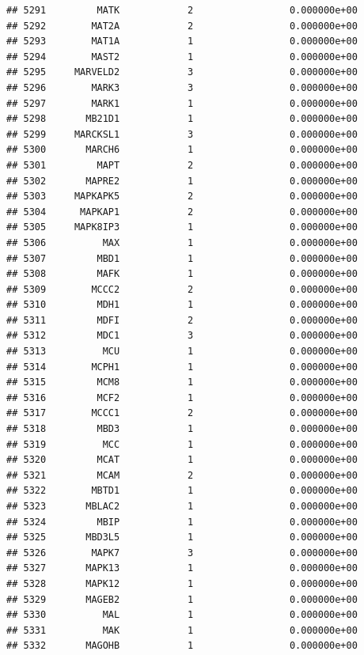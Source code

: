 \documentclass[
]{article}
\begin{document}
\begin{verbatim}
## 5291         MATK            2                 0.000000e+00
## 5292        MAT2A            2                 0.000000e+00
## 5293        MAT1A            1                 0.000000e+00
## 5294        MAST2            1                 0.000000e+00
## 5295     MARVELD2            3                 0.000000e+00
## 5296        MARK3            3                 0.000000e+00
## 5297        MARK1            1                 0.000000e+00
## 5298       MB21D1            1                 0.000000e+00
## 5299     MARCKSL1            3                 0.000000e+00
## 5300       MARCH6            1                 0.000000e+00
## 5301         MAPT            2                 0.000000e+00
## 5302       MAPRE2            1                 0.000000e+00
## 5303     MAPKAPK5            2                 0.000000e+00
## 5304      MAPKAP1            2                 0.000000e+00
## 5305     MAPK8IP3            1                 0.000000e+00
## 5306          MAX            1                 0.000000e+00
## 5307         MBD1            1                 0.000000e+00
## 5308         MAFK            1                 0.000000e+00
## 5309        MCCC2            2                 0.000000e+00
## 5310         MDH1            1                 0.000000e+00
## 5311         MDFI            2                 0.000000e+00
## 5312         MDC1            3                 0.000000e+00
## 5313          MCU            1                 0.000000e+00
## 5314        MCPH1            1                 0.000000e+00
## 5315         MCM8            1                 0.000000e+00
## 5316         MCF2            1                 0.000000e+00
## 5317        MCCC1            2                 0.000000e+00
## 5318         MBD3            1                 0.000000e+00
## 5319          MCC            1                 0.000000e+00
## 5320         MCAT            1                 0.000000e+00
## 5321         MCAM            2                 0.000000e+00
## 5322        MBTD1            1                 0.000000e+00
## 5323       MBLAC2            1                 0.000000e+00
## 5324         MBIP            1                 0.000000e+00
## 5325       MBD3L5            1                 0.000000e+00
## 5326        MAPK7            3                 0.000000e+00
## 5327       MAPK13            1                 0.000000e+00
## 5328       MAPK12            1                 0.000000e+00
## 5329       MAGEB2            1                 0.000000e+00
## 5330          MAL            1                 0.000000e+00
## 5331          MAK            1                 0.000000e+00
## 5332       MAGOHB            1                 0.000000e+00

\end{verbatim}
\end{document}

